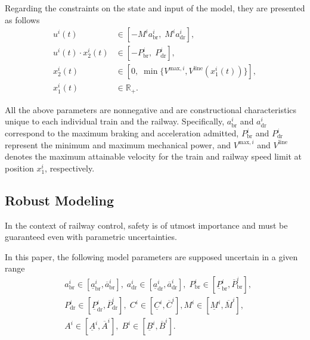 \documentclass[letterpaper, 10 pt, conference]{ieeeconf}
\theoremstyle{definition}
\theoremstyle{nopoint}
\begin{document}
Regarding the constraints on the state and input of the model, they are presented as follows
%
\begin{subequations} \label{eq:modelConstraints}
    \begin{align}
        u^i(t) &\in \left[-M^i a_{\mathrm{br}}^i, \;M^i a_{\mathrm{dr}}^i \right], \label{eq:lim1} \\
         u^i(t) \cdot x_2^i(t)&\in \left[-P^i_{\mathrm{br}}, \;P^i_{\mathrm{dr}}\right], \label{eq:lim2} \\
       x_2^i(t) &\in \left[0, \;\min\{V^{\mathrm{max},i},V^{\mathrm{line}}(x_1^i(t))\}\right], \label{eq:lim5} \\
        x_1^i(t) &\in \mathbb{R}_{+}. \label{eq:lim4}  
    \end{align}
\end{subequations}
%

All the above parameters are nonnegative and are constructional characteristics unique to each individual train and the railway.  Specifically,  $a_{\mathrm{br}}^i $ and $a_{\mathrm{dr}}^i$ correspond to the maximum braking and acceleration admitted, $P^i_{\mathrm{br}}$ and $P^i_{\mathrm{dr}}$ represent the minimum and maximum mechanical power, and $V^{\mathrm{max},i}$ and $V^{\mathrm{line}}$ denotes the maximum attainable velocity for the train and railway speed limit at position $x_1^i$, respectively.



\subsection{Robust Modeling}
\label{subsec:robustModeling}
%
In the context of railway control, safety is of utmost importance and must be guaranteed even with parametric uncertainties. 

In this paper, the following model parameters are supposed uncertain in a given range
%
\begin{eqnarray}\label{eq:train_intervals}
   &a_{\mathrm{br}}^i \in [\underline{a}_{\mathrm{br}}^i , \overline{a}_{\mathrm{br}}^i], \;
      a_{\mathrm{dr}}^i \in [\underline{a}_{\mathrm{dr}}^i , \overline{a}_{\mathrm{dr}}^i],  \;
   P^i_{\mathrm{br}} \in [\underline{P}_{\mathrm{br}}^i , \overline{P}_{\mathrm{br}}^i]  , \nonumber \\
   &P^i_{\mathrm{dr}} \in [\underline{P}_{\mathrm{dr}}^i , \overline{P}_{\mathrm{dr}}^i],   \;
   C^i \in [\underline{C}^i , \overline{C}^i ] , M^i \in [\underline{M}^i , \overline{M}^i], \;\nonumber \\
    & A^i \in [\underline{A}^i , \overline{A}^i] ,  \;
     B^i \in [\underline{B}^i , \overline{B}^i] .
\end{eqnarray}
\end{document}
